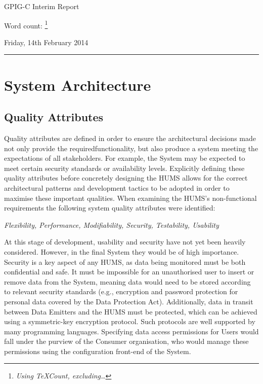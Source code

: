 \documentclass[10pt,a4paper]{article}
\begin{document}
\begin{center}
{\Large GPIG-C Interim Report}

Word count: \unskip
\footnote{\textit{Using TeXCount, excluding\ldots}} %

Friday, 14th February 2014
\end{center}

\vspace{0.3cm}
\rule{\textwidth}{0.4pt}




\section{System Architecture}
\label{sec:architecture}

\subsection{Quality Attributes}
\label{sec:architecture-quality}

Quality attributes are defined in order to ensure the architectural decisions 
made not only provide the requiredfunctionality, but also produce a system
meeting the expectations of all 
stakeholders. For example, the System may be expected to meet certain 
security standards or availability levels. Explicitly defining these quality 
attributes before concretely designing the HUMS allows for the correct 
architectural patterns and development tactics to be adopted in order to maximise these important qualities.
When examining the HUMS's non-functional requirements the 
following system quality attributes were identified:
	\begin{center}
	\textit{Flexibility, Performance, Modifiability, Security, 
Testability, Usability}
	\end{center}
At this stage of development, usability and security 
have not yet been heavily considered. However, in the final System they 
would be of high importance. Security is a key aspect of any HUMS, 
as data being monitored must be both confidential and safe. It must be impossible 
for an unauthorised user to insert or remove data from the System, meaning data
would need to be stored according to relevant security standards 
(e.g., encryption and password protection for personal data covered by the 
Data Protection Act). Additionally, data in transit between Data Emitters and the
HUMS must be protected, which can be achieved using a symmetric-key 
encryption protocol. Such protocols are well supported by many programming
languages. Specifying data access permissions for Users would fall under the 
purview of the Consumer organisation, who would manage these permissions using the 
configuration front-end of the System.
\end{document}
